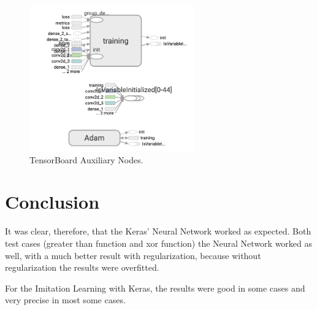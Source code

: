 \documentclass[journal]{IEEEtran}
\begin{document}
\begin{figure}
  \begin{center}
  \includegraphics[width=2.8in]{./../code/tensorboard/tensor_board_auxiliary_nodes.png}
  \caption{TensorBoard Auxiliary Nodes.}
  \label{img:tensorboard_aux}
  \end{center}
\end{figure}

\section {Conclusion}

It was clear, therefore, that the Keras' Neural Network worked as expected. Both test cases (greater than function and xor function) the Neural Network worked as well, with a much better result with regularization, because without regularization the results were overfitted.

For the Imitation Learning with Keras, the results were good in some cases and very precise in most some cases.

\vfill
\end{document}
